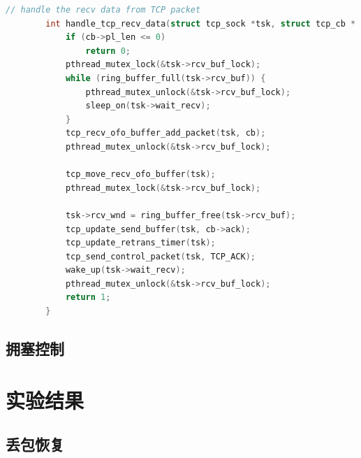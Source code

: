 \documentclass[UTF8]{report}
\begin{document}
\begin{enumerate}
\begin{lstlisting}[language=C]
        // handle the recv data from TCP packet
        int handle_tcp_recv_data(struct tcp_sock *tsk, struct tcp_cb * cb) {
            if (cb->pl_len <= 0)
                return 0;
            pthread_mutex_lock(&tsk->rcv_buf_lock);
            while (ring_buffer_full(tsk->rcv_buf)) {
                pthread_mutex_unlock(&tsk->rcv_buf_lock);
                sleep_on(tsk->wait_recv);
            }
            tcp_recv_ofo_buffer_add_packet(tsk, cb);
            pthread_mutex_unlock(&tsk->rcv_buf_lock);
        
            tcp_move_recv_ofo_buffer(tsk);
            pthread_mutex_lock(&tsk->rcv_buf_lock);
        
            tsk->rcv_wnd = ring_buffer_free(tsk->rcv_buf);
            tcp_update_send_buffer(tsk, cb->ack);
            tcp_update_retrans_timer(tsk);
            tcp_send_control_packet(tsk, TCP_ACK);
            wake_up(tsk->wait_recv);
            pthread_mutex_unlock(&tsk->rcv_buf_lock);
            return 1;
        }
    \end{lstlisting}
\end{enumerate}

\subsection{拥塞控制}

\section{实验结果}

\subsection{丢包恢复}
\end{document}
